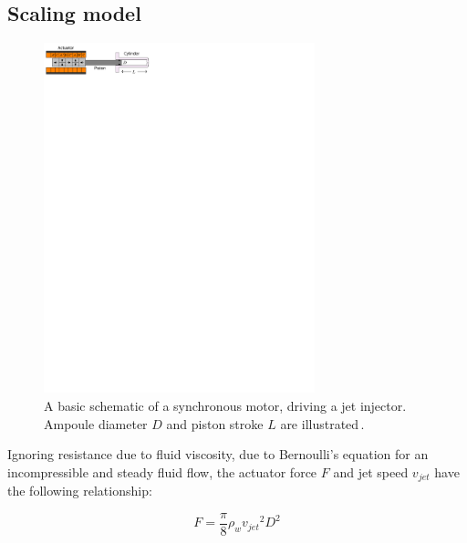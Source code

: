     \subsection{Scaling model}                  \label{Chapter:PMLSM design HM/electromagnetic model/scaling}


        \begin{figure}[ht]
          \centering
          \includegraphics[width=0.7\textwidth]{chap3/images/PMLSM_scaling_law_illustration.pdf}
          \caption[A basic schematic of a synchronous motor, driving a jet injector. Ampoule diameter $D$ and piston stroke $L$ are illustrated.]{A basic schematic of a synchronous motor, driving a jet injector. Ampoule diameter $D$ and piston stroke $L$ are illustrated\,\cite{Ruddy2015}.}
          \label{fig:chapter/hm/PMLSM scaling law illustrated}
        \end{figure}


        Ignoring resistance due to fluid viscosity, due to Bernoulli's equation for an incompressible and steady fluid flow, the actuator force $F$ and jet speed $v_{jet}$ have the following relationship:
        
        
        \begin{equation}
            F=\frac{\pi}{8}\rho_w {v_{jet}}^2 D^2
            \label{eq:actuation force by PMLSMs}
        \end{equation}
        
